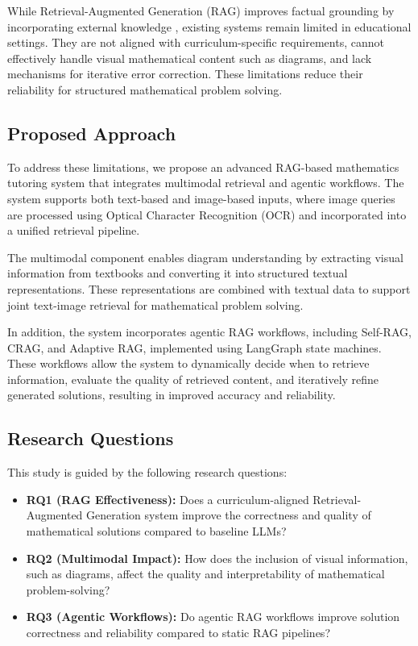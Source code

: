 \documentclass[11pt]{article}
\begin{document}
While Retrieval-Augmented Generation (RAG) improves factual grounding by incorporating external knowledge \cite{lewis2020retrieval}, existing systems remain limited in educational settings. They are not aligned with curriculum-specific requirements, cannot effectively handle visual mathematical content such as diagrams, and lack mechanisms for iterative error correction. These limitations reduce their reliability for structured mathematical problem solving.

\subsection{Proposed Approach}

To address these limitations, we propose an advanced RAG-based mathematics tutoring system that integrates multimodal retrieval and agentic workflows. The system supports both text-based and image-based inputs, where image queries are processed using Optical Character Recognition (OCR) and incorporated into a unified retrieval pipeline. 

The multimodal component enables diagram understanding by extracting visual information from textbooks and converting it into structured textual representations. These representations are combined with textual data to support joint text-image retrieval for mathematical problem solving.

In addition, the system incorporates agentic RAG workflows, including Self-RAG, CRAG, and Adaptive RAG, implemented using LangGraph state machines. These workflows allow the system to dynamically decide when to retrieve information, evaluate the quality of retrieved content, and iteratively refine generated solutions, resulting in improved accuracy and reliability.

\subsection{Research Questions}

This study is guided by the following research questions:
\begin{itemize}
    \item \textbf{RQ1 (RAG Effectiveness):} Does a curriculum-aligned Retrieval-Augmented Generation system improve the correctness and quality of mathematical solutions compared to baseline LLMs?
    \item \textbf{RQ2 (Multimodal Impact):} How does the inclusion of visual information, such as diagrams, affect the quality and interpretability of mathematical problem-solving?
    \item \textbf{RQ3 (Agentic Workflows):} Do agentic RAG workflows improve solution correctness and reliability compared to static RAG pipelines?
\end{itemize}
\end{document}

